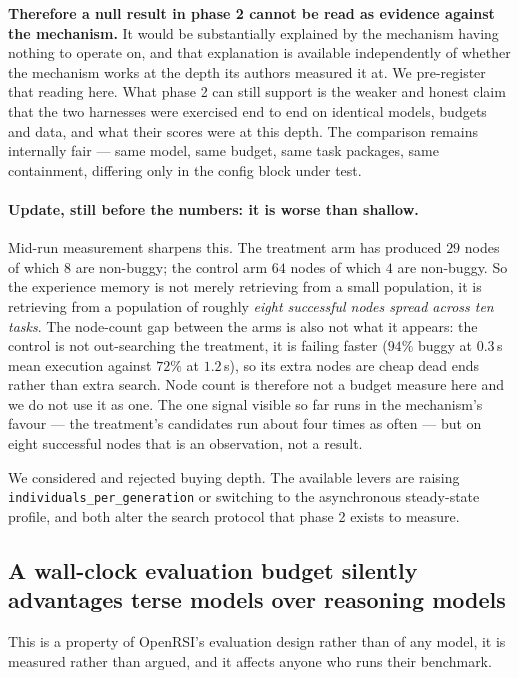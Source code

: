 \textbf{Therefore a null result in phase 2 cannot be read as evidence against the mechanism.}
It would be substantially explained by the mechanism having nothing to operate on, and that
explanation is available independently of whether the mechanism works at the depth its authors
measured it at. We pre-register that reading here. What phase 2 can still support is the
weaker and honest claim that the two harnesses were exercised end to end on identical models,
budgets and data, and what their scores were at this depth. The comparison remains internally
fair --- same model, same budget, same task packages, same containment, differing only in the
config block under test.

\paragraph{Update, still before the numbers: it is worse than shallow.}
Mid-run measurement sharpens this. The treatment arm has produced $29$ nodes of which $8$ are
non-buggy; the control arm $64$ nodes of which $4$ are non-buggy. So the experience memory is
not merely retrieving from a small population, it is retrieving from a population of roughly
\emph{eight successful nodes spread across ten tasks}. The node-count gap between the arms is
also not what it appears: the control is not out-searching the treatment, it is failing faster
($94\%$ buggy at $0.3$\,s mean execution against $72\%$ at $1.2$\,s), so its extra nodes are
cheap dead ends rather than extra search. Node count is therefore not a budget measure here
and we do not use it as one. The one signal visible so far runs in the mechanism's favour ---
the treatment's candidates run about four times as often --- but on eight successful nodes
that is an observation, not a result.

We considered and rejected buying depth. The available levers are raising
\texttt{individuals\_per\_generation} or switching to the asynchronous steady-state profile,
and both alter the search protocol that phase 2 exists to measure.

\subsection{A wall-clock evaluation budget silently advantages terse models over reasoning
models}
\label{sec:openrsiwallclock}

This is a property of OpenRSI's evaluation design rather than of any model, it is measured
rather than argued, and it affects anyone who runs their benchmark.

